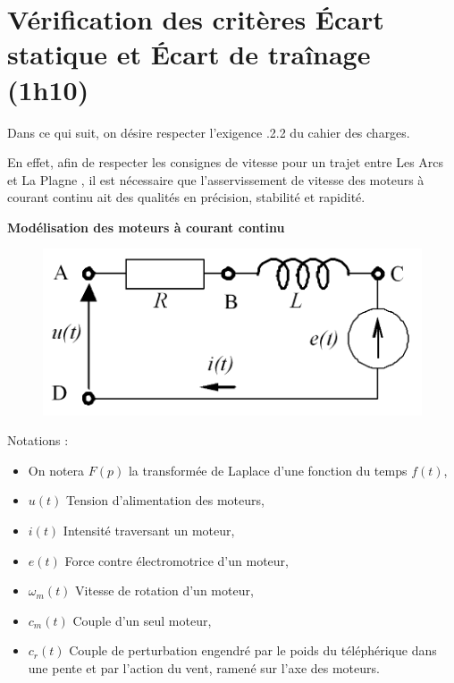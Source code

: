 \section{Vérification des critères \og Écart statique \fg et \og Écart de traînage \fg (1h10)}

Dans ce qui suit, on désire respecter l'exigence .2.2 \fg du cahier des charges.

En effet, afin de respecter les consignes de vitesse pour un trajet entre \og Les Arcs \fg et \og La Plagne \fg, il est nécessaire que l'asservissement de vitesse des moteurs à courant continu ait des qualités en précision, stabilité et rapidité.

\textbf{Modélisation des moteurs à courant continu}

\begin{figure}
	\vspace{-20pt}
	\centering \includegraphics[width=0.8\linewidth]{img/fig25}
	\label{fig25}
\end{figure}

Notations :
\begin{itemize}
 \item On notera $F(p)$ la transformée de Laplace d'une fonction du temps $f(t)$,
 \item $u(t)$ Tension d'alimentation des moteurs,
 \item $i(t)$ Intensité traversant un moteur,
 \item $e(t)$ Force contre électromotrice d'un moteur,
 \item $\omega_m(t)$ Vitesse de rotation d'un moteur,
 \item $c_m(t)$ Couple d'un seul moteur,
 \item $c_r(t)$ Couple de perturbation engendré par le poids du téléphérique dans une pente et par l'action du vent, ramené sur l'axe des moteurs.
\end{itemize}

